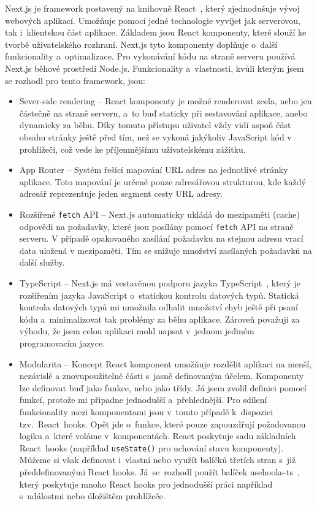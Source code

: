 \documentclass[
  biblatex,
  sourcecodes,
  glossaries,
  index
]{kidiplom}
\begin{document}
Next.js je framework postavený na knihovně React~\cite{t14}, který zjednodušuje vývoj webových aplikací. Umožňuje pomocí jedné technologie vyvíjet jak serverovou, tak i~klientskou část aplikace. Základem jsou React komponenty, které slouží ke tvorbě uživatelského rozhraní. Next.js tyto komponenty doplňuje o~další funkcionality a~optimalizace. Pro vykonávání kódu na straně serveru používá Next.js běhové prostředí Node.js. Funkcionality a~vlastnosti, kvůli kterým jsem se rozhodl pro tento framework, jsou:
\begin{itemize}
\item Sever-side rendering -- React komponenty je možné renderovat zcela, nebo jen částečně na straně serveru, a~to buď staticky při sestavování aplikace, anebo dynamicky za běhu. Díky tomuto přístupu uživatel vždy vidí aspoň část obsahu stránky ještě před tím, než se vykoná jakýkoliv JavaScript kód v prohlížeči, což vede ke příjemnějšímu uživatelskému zážitku.
\item App Router -- Systém řešící mapování URL adres na jednotlivé stránky aplikace. Toto mapování je určené pouze adresářovou strukturou, kde každý adresář reprezentuje jeden segment cesty URL adresy.
\item Rozšířené \texttt{fetch} API -- Next.js automaticky ukládá do mezipaměti (cache) odpovědi na požadavky, které jsou posílány pomocí \texttt{fetch} API na straně serveru. V případě opakovaného zasílání požadavku na stejnou adresu vrací data uložená v mezipaměti. Tím se snižuje množství zasílaných požadavků na další služby.
\item TypeScript -- Next.js má vestavěnou podporu jazyka TypeScript~\cite{t15}, který je rozšířením jazyka JavaScript o~statickou kontrolu datových typů. Statická kontrola datových typů mi umožnila odhalit množství chyb ještě při psaní kódu a~minimalizovat tak problémy za běhu aplikace. Zároveň považuji za výhodu, že jsem celou aplikaci mohl napsat v~jednom jediném programovacím jazyce.
\item Modularita -- Koncept React komponent umožňuje rozdělit aplikaci na menší, nezávislé a znovupoužitelné části s~jasně definovaným účelem. Komponenty lze definovat buď jako funkce, nebo jako třídy. Já jsem zvolil definici pomocí funkcí, protože mi připadne jednodušší a~přehlednější. Pro sdílení funkcionality mezi komponentami jsou v~tomto případě k~dispozici tzv.~React~hooks. Opět jde o~funkce, které pouze zapouzdřují požadovanou logiku a~které voláme v~komponentách. React poskytuje sadu základních React~hooks (například \texttt{useState()} pro uchování stavu komponenty). Můžeme si však definovat i~vlastní nebo využít balíčků třetích stran s~již předdefinovanými React hooks. Já~se~rozhodl použít balíček usehooks-ts~\cite{t16}, který poskytuje mnoho React hooks pro jednodušší práci například s~událostmi nebo úložištěm prohlížeče.
\end{itemize}
\end{document}
